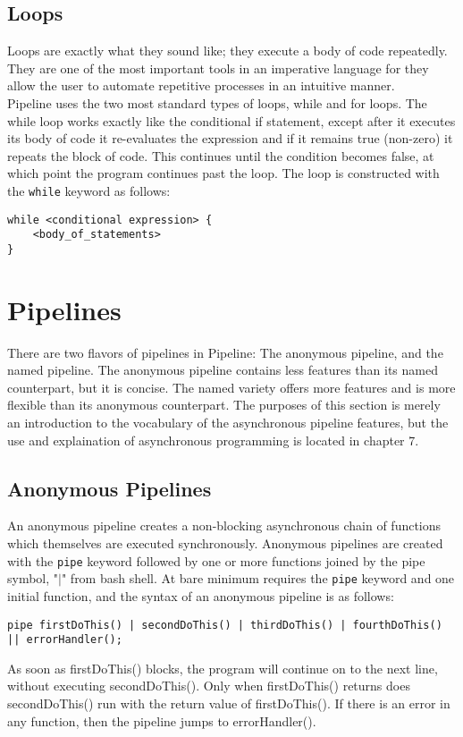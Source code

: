 \documentclass[./LRM_main.tex]{subfiles}
\begin{document}
\subsection{Loops}
Loops are exactly what they sound like; they execute a body of code repeatedly. They are one of the most important tools in an imperative language for they allow the user to automate repetitive processes in an intuitive manner.\\
Pipeline uses the two most standard types of loops, while and for loops. The while loop works exactly like the conditional if statement, except after it executes its body of code it re-evaluates the expression and if it remains true (non-zero) it repeats the block of code. This continues until the condition becomes false, at which point the program continues past the loop. The loop is constructed with the \texttt{while} keyword as follows:
\begin{lstlisting}
while <conditional expression> {
	<body_of_statements>
}
\end{lstlisting}
\section{Pipelines}
There are two flavors of pipelines in Pipeline: The anonymous pipeline, and the named pipeline. The anonymous pipeline contains less features than its named counterpart, but it is concise. The named variety offers more features and is more flexible than its anonymous counterpart. The purposes of this section is merely an introduction to the vocabulary of the asynchronous pipeline features, but the use and explaination of asynchronous programming is located in chapter 7.
\subsection{Anonymous Pipelines}
An anonymous pipeline creates a non-blocking asynchronous chain of functions which themselves are executed synchronously. Anonymous pipelines are created with the \texttt{pipe} keyword followed by one or more functions joined by the pipe symbol, "$\vert$" from 
bash shell. At bare minimum requires the \texttt{pipe} keyword and one initial function, and the syntax of an anonymous pipeline is as follows:
\begin{lstlisting}
pipe firstDoThis() | secondDoThis() | thirdDoThis() | fourthDoThis() || errorHandler();
\end{lstlisting}
As soon as firstDoThis() blocks, the program will continue on to the next line, without executing secondDoThis(). Only when firstDoThis() returns does 
secondDoThis() run with the return value of firstDoThis(). If there is an 
error in any function, then the pipeline jumps to errorHandler().
\end{document}
